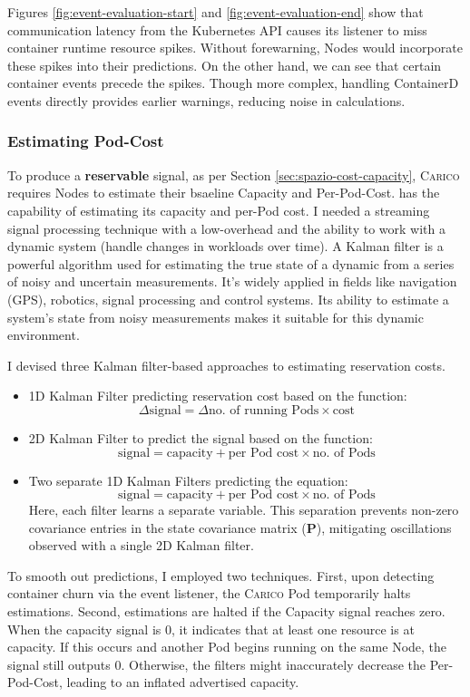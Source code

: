 Figures \ref{fig:event-evaluation-start} and
\ref{fig:event-evaluation-end} show that communication latency from the
Kubernetes API causes its listener to miss container runtime resource spikes.
Without forewarning, Nodes would incorporate these spikes into
their predictions. On the other hand, we can see that certain container
events precede the spikes. Though more complex, handling ContainerD events
directly provides earlier warnings, reducing noise in calculations.

\subsubsection{Estimating Pod-Cost}
\label{sec:estimating-cost}
To produce a \textbf{reservable} signal, as per Section
\ref{sec:spazio-cost-capacity}, \textsc{Carico} requires Nodes to estimate their
bsaeline Capacity and Per-Pod-Cost. has the capability of estimating its
capacity and per-Pod cost. I needed a streaming signal processing technique with
a low-overhead and the ability to work with a dynamic system (handle changes in
workloads over time). A Kalman filter \cite{} is a powerful algorithm used for
estimating the true state of a dynamic from a series of noisy and uncertain
measurements. It's widely applied in fields like navigation (GPS), robotics,
signal processing and control systems. Its ability to estimate a system's state
from noisy measurements makes it suitable for this dynamic environment.

I devised three Kalman filter-based approaches to estimating reservation costs.
\begin{itemize}
    \item 1D Kalman Filter predicting reservation cost based on the function:
        \[\Delta \text{signal} = \Delta \text{no. of running Pods} \times
        \text{cost}\]
    \item 2D Kalman Filter to predict the signal based on the function:
        \[\text{signal} = \text{capacity} + \text{per Pod cost} \times \text{no.
        of Pods}\]
    \item Two separate 1D Kalman Filters predicting the equation:
        \[\text{signal} = \text{capacity} + \text{per Pod cost} \times \text{no.
        of Pods}\]
        Here, each filter learns a separate variable. This separation prevents
        non-zero covariance entries in the state covariance matrix ($\mathbf{P}$),
        mitigating oscillations observed with a single 2D Kalman filter.
\end{itemize}
To smooth out predictions, I employed two techniques. First, upon detecting
container churn via the event listener, the \textsc{Carico} Pod temporarily
halts estimations. Second, estimations are halted if the Capacity signal reaches
zero. When the capacity signal is 0, it indicates that at least one resource is
at capacity. If this occurs and another Pod begins running on the same Node, the
signal still outputs 0. Otherwise, the filters might inaccurately decrease the
Per-Pod-Cost, leading to an inflated advertised capacity.

